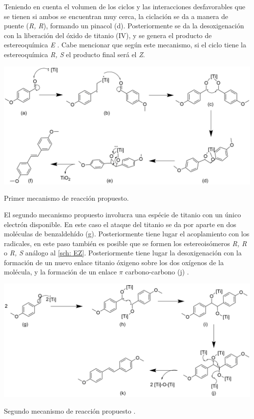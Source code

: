 \documentclass[fleqn,10pt]{SelfArx}
\begin{document}
Teniendo en cuenta el volumen de los ciclos y las interacciones desfavorables que se tienen si ambos se encuentran muy cerca, la ciclaci\'on se da a manera de puente (\textit{R, R}), formando un pinacol (d). Posteriormente se da la desoxigenaci\'on con la liberaci\'on del \'oxido de titanio (IV), y se genera el producto de estereoqu\'imica \textit{E} \cite{richards2001}. Cabe mencionar que seg\'un este mecanismo, si el ciclo tiene la estereoqu\'imica \textit{R, S} el producto final ser\'a el \textit{Z}.
\begin{scheme}[h]
	\centering
	\includegraphics[width = \linewidth]{structures/mechanism.png}
	\caption{Primer mecanismo de reacci\'on propuesto.}
\end{scheme}

El segundo mecanismo propuesto involucra una esp\'ecie de titanio con un \'unico electr\'on disponible. En este caso el ataque del titanio se da por aparte en dos mol\'eculas de benzaldeh\'ido (g). Posteriormente tiene lugar el acoplamiento con los radicales, en este paso tambi\'en es posible que se formen los estereois\'omeros \textit{R, R} o \textit{R, S} an\'alogo al \autoref{sch: EZ}. Posteriormente tiene lugar la desoxigenaci\'on con la formaci\'on de un nuevo enlace titanio \'oxigeno sobre los dos ox\'igenos de la mol\'ecula, y la formaci\'on de un enlace $\pi$ carbono-carbono (j) \cite{Wang2010}.
\begin{scheme}[h]
	\centering
	\includegraphics[width = \linewidth]{structures/mechanism2.png}
	\caption{Segundo mecanismo de reacci\'on propuesto \cite{Wang2010}.}
\end{scheme}
\end{document}

